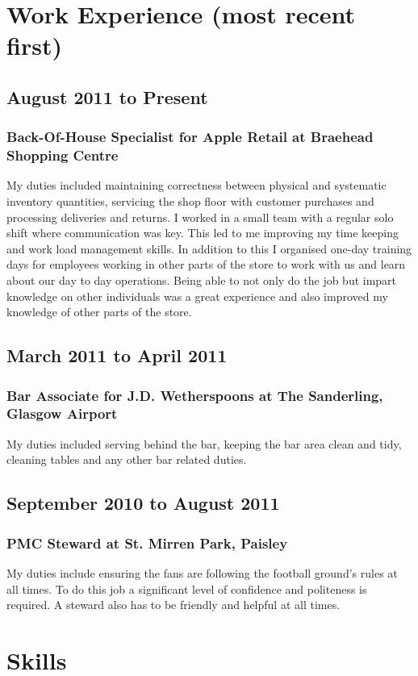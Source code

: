 \documentclass[10pt,a4paper]{article}
\begin{document}
\section*{Work Experience (most recent first)}
\subsection*{August 2011 to Present}
\subsubsection*{Back-Of-House Specialist for Apple Retail at Braehead Shopping Centre}
My duties included maintaining correctness between physical and systematic inventory quantities, servicing the shop floor with customer purchases and processing deliveries and returns. I worked in a small team with a regular solo shift where communication was key. This led to me improving my time keeping and work load management skills. In addition to this I organised one-day training days for employees working in other parts of the store to work with us and learn about our day to day operations. Being able to not only do the job but impart knowledge on other individuals was a great experience and also improved my knowledge of other parts of the store.
\subsection*{March 2011 to April 2011}
\subsubsection*{Bar Associate for J.D. Wetherspoons at The Sanderling, Glasgow Airport}
My duties included serving behind the bar, keeping the bar area clean and tidy, cleaning tables and any other bar related duties.
\subsection*{September 2010 to August 2011}
\subsubsection*{PMC Steward at St. Mirren Park, Paisley}
My duties include ensuring the fans are following the football ground's rules at all times. To do this job a significant level of confidence and politeness is required. A steward also has to be friendly and helpful at all times.
\section*{Skills}
\end{document}
